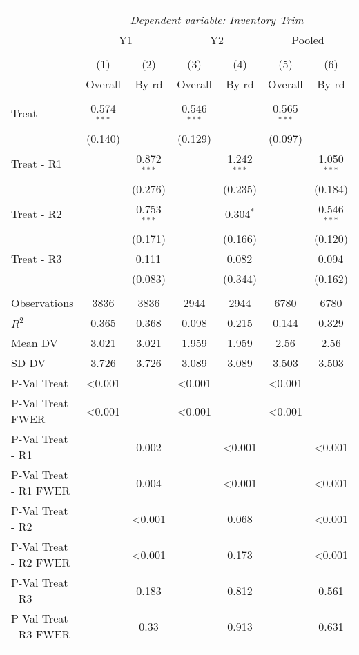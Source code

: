 
\begin{tabular}{@{\extracolsep{5pt}}lcccccc}
\\[-1.8ex]\hline
\hline \\[-1.8ex]
& \multicolumn{6}{c}{\textit{Dependent variable: Inventory Trim}} \
\cr \cline{2-7}
\\[-1.8ex] & \multicolumn{2}{c}{Y1} & \multicolumn{2}{c}{Y2} & \multicolumn{2}{c}{Pooled}  \\
\\[-1.8ex] & (1) & (2) & (3) & (4) & (5) & (6) 
 \\ & Overall & By rd & Overall & By rd & Overall & By rd \\
\hline \\[-1.8ex]
 Treat & 0.574$^{***}$ & & 0.546$^{***}$ & & 0.565$^{***}$ & \\
& (0.140) & & (0.129) & & (0.097) & \\
 Treat - R1 & & 0.872$^{***}$ & & 1.242$^{***}$ & & 1.050$^{***}$ \\
& & (0.276) & & (0.235) & & (0.184) \\
 Treat - R2 & & 0.753$^{***}$ & & 0.304$^{*}$ & & 0.546$^{***}$ \\
& & (0.171) & & (0.166) & & (0.120) \\
 Treat - R3 & & 0.111$^{}$ & & 0.082$^{}$ & & 0.094$^{}$ \\
& & (0.083) & & (0.344) & & (0.162) \\
\hline \\[-1.8ex]
 Observations & 3836 & 3836 & 2944 & 2944 & 6780 & 6780 \\
 $R^2$ & 0.365 & 0.368 & 0.098 & 0.215 & 0.144 & 0.329 \\
 Mean DV & 3.021 & 3.021 & 1.959 & 1.959 & 2.56 & 2.56 \\
 SD DV & 3.726 & 3.726 & 3.089 & 3.089 & 3.503 & 3.503 \\
 P-Val Treat & <0.001 &  & <0.001 &  & <0.001 &  \\
 P-Val Treat FWER & <0.001 &  & <0.001 &  & <0.001 &  \\
 P-Val Treat - R1 &  & 0.002 &  & <0.001 &  & <0.001 \\
 P-Val Treat - R1 FWER &  & 0.004 &  & <0.001 &  & <0.001 \\
 P-Val Treat - R2 &  & <0.001 &  & 0.068 &  & <0.001 \\
 P-Val Treat - R2 FWER &  & <0.001 &  & 0.173 &  & <0.001 \\
 P-Val Treat - R3 &  & 0.183 &  & 0.812 &  & 0.561 \\
 P-Val Treat - R3 FWER &  & 0.33 &  & 0.913 &  & 0.631 \\
\hline
\hline \\[-1.8ex]
\end{tabular}
